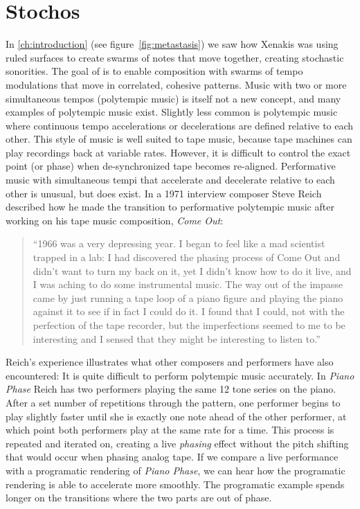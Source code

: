\section{Stochos}
\label{sec:polytempic-stochos}
In \autoref{ch:introduction} (see figure~\ref{fig:metastasis}) we saw
how Xenakis was using ruled surfaces to create swarms of notes that
move together, creating stochastic sonorities. The goal of \polytempic
is to enable composition with swarms of tempo modulations that move in
correlated, cohesive patterns. Music with two or more simultaneous
tempos (polytempic music) is itself not a new concept, and many
examples of polytempic music exist\cite{Greschak2003}. Slightly less
common is polytempic music where continuous tempo accelerations or
decelerations are defined relative to each other. This style of music
is well suited to tape music, because tape machines can play
recordings back at variable rates. However, it is difficult to control
the exact point (or phase) when de-synchronized tape becomes
re-aligned. Performative music with simultaneous tempi that accelerate
and decelerate relative to each other is unusual, but does exist. In
a 1971 interview composer Steve Reich described how he made the
transition to performative polytempic music after working on his tape
music composition, \textit{Come Out}:
\begin{quotation}
  ``1966 was a very depressing year. I began to feel like a mad
  scientist trapped in a lab: I had discovered the phasing process
  of Come Out and didn't want to turn my back on it, yet I didn't know
  how to do it live, and I was aching to do some instrumental
  music. The way out of the impasse came by just running a tape loop
  of a piano figure and playing the piano against it to see if in fact
  I could do it. I found that I could, not with the perfection of the
  tape recorder, but the imperfections seemed to me to be interesting
  and I sensed that they might be interesting to listen to.''\cite{Nyman2015}
\end{quotation}
Reich's experience illustrates what other composers and performers
have also encountered: It is quite difficult to perform polytempic
music accurately. In \textit{Piano Phase} Reich has two performers
playing the same 12 tone series on the piano. After a set number of
repetitions through the pattern, one performer begins to play slightly
faster until she is exactly one note ahead of the other performer, at
which point both performers play at the same rate for a time. This
process is repeated and iterated on, creating a live \emph{phasing}
effect without the pitch shifting that would occur when phasing analog
tape. If we compare a live performance\cite{Huisman1989} with a
programatic rendering\cite{Chen2014} of \textit{Piano Phase}, we can
hear how the programatic rendering is able to accelerate more
smoothly. The programatic example spends longer on the transitions
where the two parts are out of phase.

